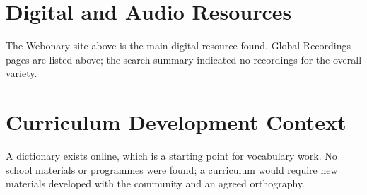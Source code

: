 \documentclass[12pt]{article}
\begin{document}
\section{Digital and Audio Resources}
The Webonary site above is the main digital resource found. Global Recordings pages are listed above; the search summary indicated no recordings for the overall variety.

\section{Curriculum Development Context}
A dictionary exists online, which is a starting point for vocabulary work. No school materials or programmes were found; a curriculum would require new materials developed with the community and an agreed orthography.
\end{document}
